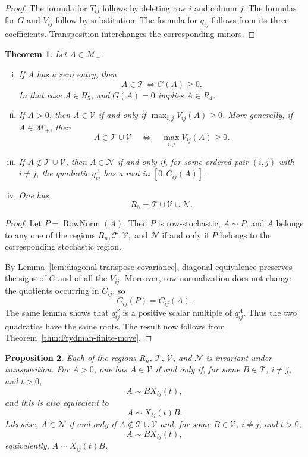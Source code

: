 \documentclass[11pt,onecolumn]{amsart}
\theoremstyle{plain}
\newtheorem{theorem}{Theorem}[section]
\newtheorem{proposition}[theorem]{Proposition}
\theoremstyle{definition}
\theoremstyle{remark}
\newcommand{\RowNorm}{\operatorname{RowNorm}}
\newcommand{\T}{\mathcal T}
\newcommand{\V}{\mathcal V}
\newcommand{\NH}{\mathcal N}
\begin{document}
\begin{proof}
The formula for $T_{ij}$ follows by deleting row $i$ and column $j$.
The formulas for $G$ and $V_{ij}$ follow by substitution. The formula
for $q_{ij}$ follows from its three coefficients. Transposition
interchanges the corresponding minors.
\end{proof}



\begin{theorem}
	\label{thm:homogeneous-finite-move}
	Let $A\in\mathcal M_+$.
	\begin{enumerate}[(i)]
		\item
		If $A$ has a zero entry, then 
		\[
		A\in\T\Longleftrightarrow G(A)\geq0.
		\]
		In that case $A\in R_5$, and $G(A)=0$ implies $A\in R_4$.
		
		\item
		If $A>0$, then $A\in\V$ if and only if $\max_{i,j}V_{ij}(A)\geq0$.
		More generally, if $A\in \mathcal M_+$, then
		\[
		A\in\T\cup\V
		\quad\Longleftrightarrow\quad
		\max_{i,j}V_{ij}(A)\geq0.
		\]
		
		\item
		If $A\notin\T\cup\V$, then $A\in\NH$ if and only if, for some
		ordered pair $(i,j)$ with $i\neq j$, the quadratic $q_{ij}^A$
		has a root in $[0,C_{ij}(A)]$.
	
		
		\item
		One has
		\[
		R_6=\T\cup\V\cup\NH.
		\]
	\end{enumerate}
\end{theorem}

\begin{proof}
	Let
	$P=\RowNorm(A)$.
	Then $P$ is row-stochastic, $A\sim P$, and
	$A$ belongs to any one of the regions $R_n,\T,\V,$ and $\NH$ if and
	only if $P$ belongs to the corresponding stochastic region.
	
	By Lemma~\ref{lem:diagonal-transpose-covariance}, diagonal equivalence
	preserves the signs of $G$ and of all the $V_{ij}$. Moreover, row
	normalization does not change the quotients occurring in $C_{ij}$, so
	\[
	C_{ij}(P)=C_{ij}(A).
	\]
	The same lemma shows that $q_{ij}^P$ is a positive scalar multiple of
	$q_{ij}^A$. Thus the two quadratics have the same roots. The result now
	follows from Theorem~\ref{thm:Frydman-finite-move}.
\end{proof}


\begin{proposition}
\label{prop:first-last-symmetry}
Each of the regions $R_n$, $\T$, $\V$, and $\NH$ is invariant under
transposition. For $A>0$, one has $A\in\V$ if and only if, for some
$B\in\T$, $i\neq j$, and $t>0$,
\[
A\sim BX_{ij}(t),
\]
and this is also equivalent to
\[
A\sim X_{ij}(t)B.
\]
Likewise, $A\in\NH$ if and only if $A\notin\T\cup\V$ and, for some
$B\in\V$, $i\neq j$, and $t>0$,
\[
A\sim BX_{ij}(t),
\]
equivalently, $A\sim X_{ij}(t)B$.
\end{proposition}
\end{document}
